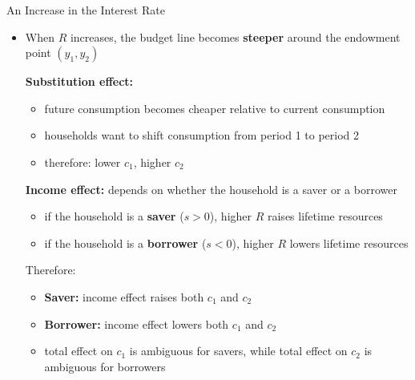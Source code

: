 \documentclass[10pt,aspectratio=169]{beamer}
\begin{document}
\begin{frame}{An Increase in the Interest Rate}

\begin{itemize}
    \item When \(R\) increases, the budget line becomes \textbf{steeper} around the endowment point \((y_1,y_2)\)

    \itemvso \textbf{Substitution effect:}
    \begin{itemize}
        \item future consumption becomes cheaper relative to current consumption
        \item households want to shift consumption from period 1 to period 2
        \item therefore: lower \(c_1\), higher \(c_2\)
    \end{itemize}

    \itemvso \textbf{Income effect:} depends on whether the household is a saver or a borrower
    \begin{itemize}
        \item if the household is a \textbf{saver} (\(s>0\)), higher \(R\) raises lifetime resources
        \item if the household is a \textbf{borrower} (\(s<0\)), higher \(R\) lowers lifetime resources
    \end{itemize}

    \itemvso Therefore:
    \begin{itemize}
        \item \textbf{Saver:} income effect raises both \(c_1\) and \(c_2\)
        \item \textbf{Borrower:} income effect lowers both \(c_1\) and \(c_2\)
        \item total effect on \(c_1\) is ambiguous for savers, while total effect on \(c_2\) is ambiguous for borrowers
    \end{itemize}
\end{itemize}

\end{frame}
\end{document}
